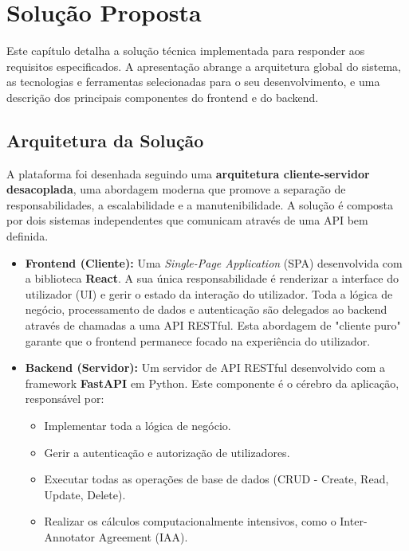 \chapter{Solução Proposta}
\label{cha:solucao_proposta}

Este capítulo detalha a solução técnica implementada para responder aos requisitos especificados. A apresentação abrange a arquitetura global do sistema, as tecnologias e ferramentas selecionadas para o seu desenvolvimento, e uma descrição dos principais componentes do frontend e do backend.

\section{Arquitetura da Solução}

A plataforma foi desenhada seguindo uma \textbf{arquitetura cliente-servidor desacoplada}, uma abordagem moderna que promove a separação de responsabilidades, a escalabilidade e a manutenibilidade. A solução é composta por dois sistemas independentes que comunicam através de uma API bem definida.

\begin{itemize}
    \item \textbf{Frontend (Cliente):} Uma \textit{Single-Page Application} (SPA) desenvolvida com a biblioteca \textbf{React}. A sua única responsabilidade é renderizar a interface do utilizador (UI) e gerir o estado da interação do utilizador. Toda a lógica de negócio, processamento de dados e autenticação são delegados ao backend através de chamadas a uma API RESTful. Esta abordagem de "cliente puro" garante que o frontend permanece focado na experiência do utilizador.

    \item \textbf{Backend (Servidor):} Um servidor de API RESTful desenvolvido com a framework \textbf{FastAPI} em Python. Este componente é o cérebro da aplicação, responsável por:
    \begin{itemize}
        \item Implementar toda a lógica de negócio.
        \item Gerir a autenticação e autorização de utilizadores.
        \item Executar todas as operações de base de dados (CRUD - Create, Read, Update, Delete).
        \item Realizar os cálculos computacionalmente intensivos, como o Inter-Annotator Agreement (IAA).
    \end{itemize}
\end{itemize}

